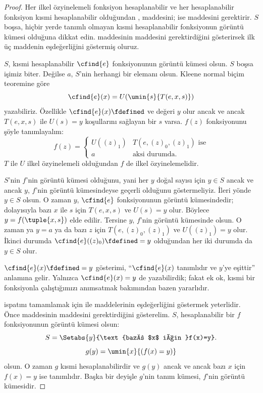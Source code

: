 \documentclass[../../../include/open-logic-section]{subfiles}
\begin{document}
\begin{proof}
Her ilkel özyinelemeli fonksiyon hesaplanabilir ve her hesaplanabilir
fonksiyon kısmi hesaplanabilir olduğundan ,
 maddesini;  ise
 maddesini gerektirir. $S$ boşsa, hiçbir yerde tanımlı
olmayan kısmi hesaplanabilir fonksiyonun görüntü kümesi olduğuna dikkat edin.
 maddesinin  maddesini gerektirdiğini
gösterirsek ilk üç maddenin eşdeğerliğini göstermiş oluruz.

$S$, kısmi hesaplanabilir $\cfind{e}$ fonksiyonunun görüntü kümesi olsun.
$S$ boşsa işimiz biter. Değilse $a$, $S$'nin herhangi bir elemanı olsun.
Kleene normal biçim teoremine göre
\[
  \cfind{e}(x)=U(\umin{s}{T(e,x,s)})
\]
yazabiliriz. Özellikle $\cfind{e}(x)\fdefined$ ve değeri $y$ olur ancak ve
ancak $T(e,x,s)$ ile $U(s)=y$ koşullarını sağlayan bir $s$ varsa. $f(z)$
fonksiyonunu şöyle tanımlayalım:
\[
  f(z)=\begin{cases}
    U((z)_1) & \text{$T(e,(z)_0,(z)_1)$ ise}\\
    a & \text{aksi durumda.}
  \end{cases}
\]
$T$ ile $U$ ilkel özyinelemeli olduğundan $f$ de ilkel özyinelemelidir.

$S$'nin $f$'nin görüntü kümesi olduğunu, yani her $y$ doğal sayısı için
$y\in S$ ancak ve ancak $y$, $f$'nin görüntü kümesindeyse geçerli olduğunu
göstermeliyiz. İleri yönde $y\in S$ olsun. O zaman $y$, $\cfind{e}$
fonksiyonunun görüntü kümesindedir; dolayısıyla bazı $x$ ile $s$ için
$T(e,x,s)$ ve $U(s)=y$ olur. Böylece $y=f(\tuple{x,s})$ elde edilir.
Tersine $y$, $f$'nin görüntü kümesinde olsun. O zaman ya $y=a$ ya da bazı
$z$ için $T(e,(z)_0,(z)_1)$ ve $U((z)_1)=y$ olur. İkinci durumda
$\cfind{e}((z)_0)\fdefined=y$ olduğundan her iki durumda da $y\in S$ olur.

$\cfind{e}(x)\fdefined=y$ gösterimi, ``$\cfind{e}(x)$ tanımlıdır ve $y$'ye
eşittir'' anlamına gelir. Yalnızca $\cfind{e}(x)=y$ de yazabilirdik; fakat ek
ok, kısmi bir fonksiyonla çalıştığımızı anımsatmak bakımından bazen yararlıdır.

 ispatını tamamlamak için  ile
 maddelerinin eşdeğerliğini göstermek yeterlidir. Önce
 maddesinin  maddesini gerektirdiğini
gösterelim. $S$, hesaplanabilir bir $f$ fonksiyonunun görüntü kümesi olsun:
\[
  S=\Setabs{y}{\text{bazı $x$ için }f(x)=y}.
\]
\[
  g(y)=\umin{x}{(f(x)=y)}
\]
olsun. O zaman $g$ kısmi hesaplanabilirdir ve $g(y)$ ancak ve ancak bazı
$x$ için $f(x)=y$ ise tanımlıdır. Başka bir deyişle $g$'nin tanım kümesi,
$f$'nin görüntü kümesidir. 


\end{proof}
\end{document}
